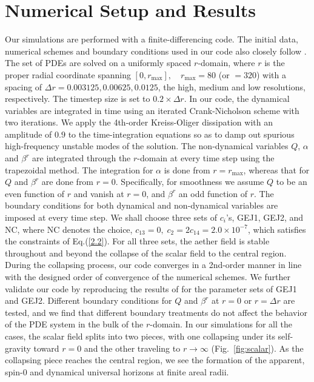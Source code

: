 \documentclass[aps,preprintnumbers,twocolumn,showpacs]{revtex4-1}
\begin{document}
 
 
\section{Numerical Setup and Results}

Our simulations are performed with a finite-differencing code. The initial data, numerical schemes and boundary conditions used in our code also closely follow   \cite{GEJ07}. The set of PDEs are solved on a uniformly spaced $r$-domain, where $r$ is the proper radial coordinate spanning $[0,r_{\text{max}}], \quad r_{\text{max}} = 80$ (or $=320$) with a spacing of $\Delta r=0.003125, 0.00625, 0.0125$, the high, medium and low resolutions, respectively. The timestep size is set to $0.2\times\Delta r$. In our code, the dynamical variables are integrated in time using an iterated Crank-Nicholson scheme with two iterations. We apply the 4th-order Kreiss-Oliger dissipation with an amplitude of $0.9$ to the time-integration equations so as to damp out spurious high-frequency unstable modes of the solution. The non-dynamical variables $Q$, $\alpha$ and $\beta^r$ are integrated through the $r$-domain at every time step using the trapezoidal method. The integration for $\alpha$ is done from $r=r_{\text{max}}$, whereas that for $Q$ and $\beta^r$ are done from $r=0$. Specifically, for smoothness we assume $Q$ to be an even function of $r$ and  vanish at $r=0$, and $\beta^r$ an odd function of $r$. The boundary conditions for both dynamical and non-dynamical variables are imposed at every time step. We shall choose three sets of $c_{i}$'s, GEJ1, GEJ2, and NC, where NC denotes the choice, $c_{13} = 0, \; c_2 = 2 c_{14} = 2.0 \times 10^{-7}$,  which satisfies the constraints of Eq.(\ref{2.2}). For all three sets, the aether field is stable throughout and beyond the collapse of the scalar field to the central region. During the collapsing process, our code converges in a 2nd-order manner in line with the designed order of convergence of the numerical schemes. We further validate our code by reproducing the results of  \cite{GEJ07} for the parameter sets of GEJ1 and GEJ2. Different boundary conditions for $Q$ and $\beta^r$ at $r=0$ or $r=\Delta r$ are tested, and we find  that different boundary treatments do not affect the behavior of the PDE system in the bulk of the $r$-domain.  In our simulations for all the cases, the scalar field splits into two pieces, with one collapsing under its self-gravity toward $r=0$ and the other traveling to $r\to\infty$ (Fig.~\ref{fig:scalar}). As the collapsing piece reaches the central region, we see the formation of the apparent, spin-0 and dynamical universal horizons at finite areal radii. 
\end{document}

